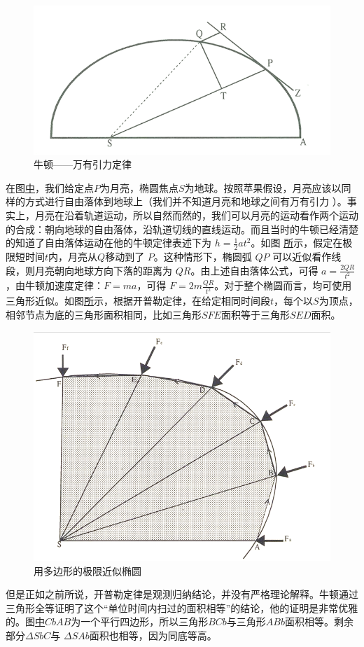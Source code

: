 \documentclass[a4paper]{article}
\begin{document}
    \begin{figure}[htp]
        \centering
        \includegraphics[scale=0.55]{newtongra.png}
        \caption{牛顿——万有引力定律}
        \label{newtongra}
    \end{figure}
    
在图\href{newtongra}中，我们给定点$P$为月亮，椭圆焦点$S$为地球。按照苹果假设，月亮应该以同样的方式进行自由落体到地球上（我们并不知道月亮和地球之间有万有引力 ）。事实上，月亮在沿着轨道运动，所以自然而然的，我们可以月亮的运动看作两个运动的合成：朝向地球的自由落体，沿轨道切线的直线运动。而且当时的牛顿已经清楚的知道了自由落体运动在他的牛顿定律表述下为 $h=\frac{1}{2}at^{2}$。如图 \href{newtongra}所示，假定在极限短时间$t$内，月亮从$Q$移动到了 $P$。这种情形下，椭圆弧 $QP$ 可以近似看作线段，则月亮朝向地球方向下落的距离为 $QR$。由上述自由落体公式，可得 $a=\frac{2QR}{t^{2}}$，由牛顿加速度定律：$F=ma$，可得 $F=2m\frac{QR}{t^{2}}$。对于整个椭圆而言，均可使用三角形近似。如图\href{newtonlimit}所示，根据开普勒定律，在给定相同时间段$t$，每个以$S$为顶点，相邻节点为底的三角形面积相同，比如三角形$SFE$面积等于三角形$SED$面积。

\begin{figure}[htp]
    \centering
    \includegraphics[scale=0.4]{newtonlimit.png}
    \caption{用多边形的极限近似椭圆}
    \label{newtonlimit}
\end{figure}
但是正如之前所说，开普勒定律是观测归纳结论，并没有严格理论解释。牛顿通过三角形全等证明了这个“单位时间内扫过的面积相等”的结论，他的证明是非常优雅的。图\href{samearea}中$CbAB$为一个平行四边形，所以三角形$BCb$与三角形$ABb$面积相等。剩余部分$\Delta SbC$与 $\Delta SAb$面积也相等，因为同底等高。
\end{document}
